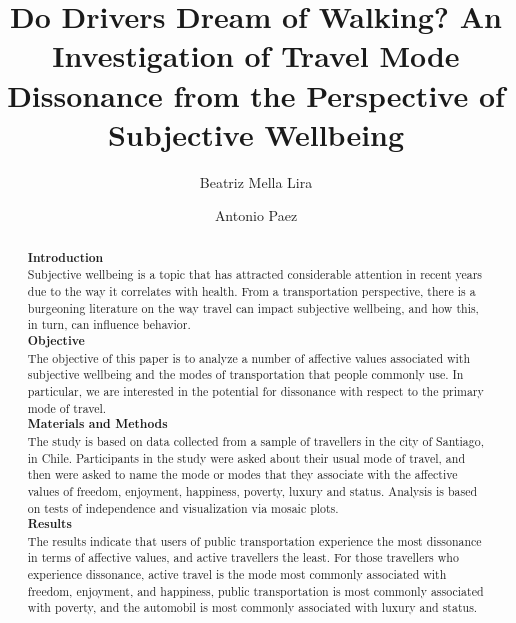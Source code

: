\documentclass[]{elsarticle} %
\begin{document}
\begin{frontmatter}

  \title{Do Drivers Dream of Walking? An Investigation of Travel Mode Dissonance
from the Perspective of Subjective Wellbeing}
    \author[University College London]{Beatriz Mella Lira}
    \author[McMaster University]{Antonio Paez}
  
      \address[University College London]{Bartlett School of Planning, Sixth Floor, Central House, 14 Upper Woburn
Place, London, WC1H0NN UK}
    \address[McMaster University]{School of Geography and Earth Sciences, 1280 Main St W, Hamilton,
Ontario, L8S 1S4 Canada}
  
  \begin{abstract}
  \textbf{Introduction}\\
  Subjective wellbeing is a topic that has attracted considerable
  attention in recent years due to the way it correlates with health. From
  a transportation perspective, there is a burgeoning literature on the
  way travel can impact subjective wellbeing, and how this, in turn, can
  influence behavior.\\
  \textbf{Objective}\\
  The objective of this paper is to analyze a number of affective values
  associated with subjective wellbeing and the modes of transportation
  that people commonly use. In particular, we are interested in the
  potential for dissonance with respect to the primary mode of travel.\\
  \textbf{Materials and Methods}\\
  The study is based on data collected from a sample of travellers in the
  city of Santiago, in Chile. Participants in the study were asked about
  their usual mode of travel, and then were asked to name the mode or
  modes that they associate with the affective values of freedom,
  enjoyment, happiness, poverty, luxury and status. Analysis is based on
  tests of independence and visualization via mosaic plots.\\
  \textbf{Results}\\
  The results indicate that users of public transportation experience the
  most dissonance in terms of affective values, and active travellers the
  least. For those travellers who experience dissonance, active travel is
  the mode most commonly associated with freedom, enjoyment, and
  happiness, public transportation is most commonly associated with
  poverty, and the automobil is most commonly associated with luxury and
  status.
  \end{abstract}
  
 \end{frontmatter}
\end{document}
